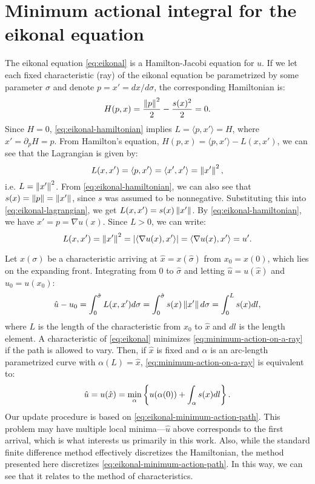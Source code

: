 \documentclass[eikonal.tex]{subfiles}
\begin{document}
\section[Minimum action integral]{Minimum actional integral for the
  eikonal equation}\label{sec:minimum-action-integral} The eikonal
equation \cref{eq:eikonal} is a Hamilton-Jacobi equation
for $u$. If we let each fixed characteristic (ray) of the eikonal
equation be parametrized by some parameter $\sigma$ and denote
$p = x' = dx/d\sigma$, the corresponding Hamiltonian is:
\begin{equation}
  \label{eq:eikonal-hamiltonian}
  H{(p, x)} = \frac{\norm{p}^2}{2} - \frac{s(x)^2}{2} = 0.
\end{equation}
Since $H = 0$, \cref{eq:eikonal-hamiltonian} implies
$L = \langle p, x'\rangle = H$, where $x' = \partial_p H = p$.  From
Hamilton's equation, $H(p, x) = \langle p, x'\rangle - L(x, x')$, we
can see that the Lagrangian is given by:
\begin{equation}
  \label{eq:eikonal-lagrangian}
  L(x, x') = \langle p, x'\rangle = \langle x', x'\rangle = \norm{x'}^2,
\end{equation}
i.e. $L = \left\|x'\right\|^2$. From \cref{eq:eikonal-hamiltonian}, we can
also see that $s(x) = \left\|p\right\| = \left\|x'\right\|$, since $s$ was assumed to
be nonnegative. Substituting this into \cref{eq:eikonal-lagrangian},
we get $L(x, x') = s(x) \left\|x'\right\|$. By \cref{eq:eikonal-hamiltonian},
we have $x' = p = \nabla u(x)$. Since $L > 0$, we can write:
\begin{equation}
  L(x, x') = \left\|x'\right\|^2 = \left|\langle \nabla u(x), x'\rangle\right| = \langle \nabla u(x), x'\rangle = u'.
\end{equation}

Let $x(\sigma)$ be a characteristic arriving at
$\hat{x} = x(\hat\sigma)$ from $x_0 = x(0)$, which lies on the
expanding front. Integrating from $0$ to $\hat\sigma$ and letting
$\hat u = u(\hat x)$ and $u_0 = u(x_0)$:
\begin{equation}
  \label{eq:minimum-action-on-a-ray}
  \hat u - u_0 = \int_{0}^{\hat\sigma} L(x, x') d\sigma = \int_{0}^{\hat\sigma} s(x) \norm{x'} d\sigma = \int_0^L s(x) dl,
\end{equation}
where $L$ is the length of the characteristic from $x_0$ to $\hat{x}$
and $dl$ is the length element. A characteristic of \cref{eq:eikonal}
minimizes \cref{eq:minimum-action-on-a-ray} if the path is allowed to
vary. Then, if $\hat{x}$ is fixed and $\alpha$ is an arc-length
parametrized curve with $\alpha(L) = \hat{x}$,
\cref{eq:minimum-action-on-a-ray} is equivalent to:
\begin{equation}\label{eq:eikonal-minimum-action-path}
  \hat{u} = u(\hat{x}) = \min_\alpha \curlyb{u(\alpha(0)) + \int_\alpha s(x) dl}.
\end{equation}
Our update procedure is based on
\cref{eq:eikonal-minimum-action-path}. This problem may have multiple
local minima---$\hat{u}$ above corresponds to the first arrival, which
is what interests us primarily in this work. Also, while the standard
finite difference method effectively discretizes the Hamiltonian, the
method presented here discretizes
\cref{eq:eikonal-minimum-action-path}. In this way, we can see that it
relates to the method of characteristics.
\end{document}
